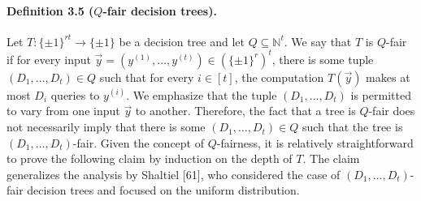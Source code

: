\documentclass[10pt,a4paper]{article}
\begin{document}
\paragraph{Definition 3.5 ($Q$-fair decision trees).} Let $T:\{\pm1\}^{rt}\to\{\pm1\}$ be a decision tree and let $Q\subseteq\mathbb N^t$. We say that $T$ is $Q$-fair if for every input $\vec y=(y^{(1)},\ldots,y^{(t)})\in(\{\pm1\}^r)^t$, there is some tuple $(D_1,\ldots,D_t)\in Q$ such that for every $i\in[t]$, the computation $T(\vec y)$ makes at most $D_i$ queries to $y^{(i)}$.
We emphasize that the tuple $(D_1,\ldots,D_t)$ is permitted to vary from one input $\vec y$ to another. Therefore, the fact that a tree is $Q$-fair does not necessarily imply that there is some $(D_1,\ldots,D_t)\in Q$ such that the tree is $(D_1,\ldots,D_t)$-fair. Given the concept of $Q$-fairness, it is relatively straightforward to prove the following claim by induction on the depth of $T$. The claim generalizes the analysis by Shaltiel [61], who considered the case of $(D_1,\ldots,D_t)$-fair decision trees and focused on the uniform distribution.
\end{document}
